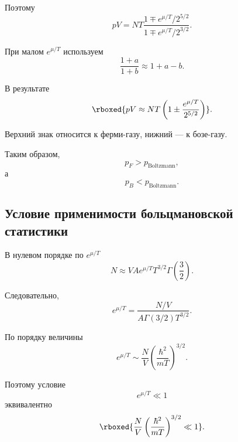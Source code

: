 \documentclass[../final.tex]{subfiles}
\begin{document}
Поэтому
%
\begin{equation*}
    pV
    =
    NT
    \frac{
        1
        \mp
        e^{\mu/T}/2^{5/2}
    }{
        1
        \mp
        e^{\mu/T}/2^{3/2}
    }.
\end{equation*}

При малом $e^{\mu/T}$ используем
%
\begin{equation*}
    \frac{1+a}{1+b}
    \approx
    1+a-b.
\end{equation*}

В результате
%
\[
    \rboxed{
        pV
        \approx
        NT
        \left(
            1
            \pm
            \frac{
                e^{\mu/T}
            }{
                2^{5/2}
            }
        \right)
    }.
\]

Верхний знак относится к ферми-газу, нижний --- к бозе-газу.

Таким образом,
%
\begin{equation*}
    p_F
    >
    p_{\mathrm{Boltzmann}},
\end{equation*}
%
а
%
\begin{equation*}
    p_B
    <
    p_{\mathrm{Boltzmann}}.
\end{equation*}


\subsection{Условие применимости больцмановской статистики}

В нулевом порядке по $e^{\mu/T}$
%
\begin{equation*}
    N
    \approx
    VA
    e^{\mu/T}
    T^{3/2}
    \Gamma
    \left(
        \frac{3}{2}
    \right).
\end{equation*}

Следовательно,
%
\begin{equation*}
    e^{\mu/T}
    =
    \frac{
        N/V
    }{
        A
        \Gamma(3/2)
        T^{3/2}
    }.
\end{equation*}

По порядку величины
%
\begin{equation*}
    e^{\mu/T}
    \sim
    \frac{N}{V}
    \left(
        \frac{\hbar^2}{mT}
    \right)^{3/2}.
\end{equation*}

Поэтому условие
%
\begin{equation*}
    e^{\mu/T}
    \ll
    1
\end{equation*}
%
эквивалентно
%
\[
    \rboxed{
        \frac{N}{V}
        \left(
            \frac{\hbar^2}{mT}
        \right)^{3/2}
        \ll
        1
    }.
\]
\end{document}

